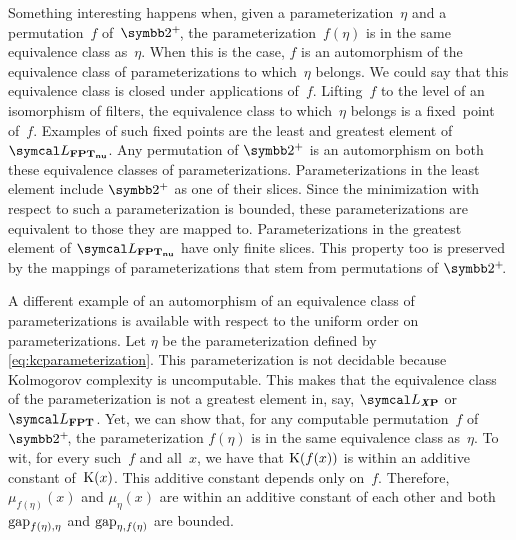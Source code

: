 Something interesting happens when, given a parameterization~$\eta$ and a permutation~$f$ of~$\binary^+\!$, the parameterization~$f(\eta)$ is in the same equivalence class as~$\eta$.
When this is the case, $f$ is an automorphism of the equivalence class of parameterizations to which~$\eta$ belongs.
We could say that this equivalence class is closed under applications of~$f$.
Lifting~$f$ to the level of an isomorphism of filters, the equivalence class to which~$\eta$ belongs is a fixed~point of~$f$.
Examples of such fixed points are the least and greatest element of $\calL_\clnu{FPT}$.
Any permutation of $\binary^+$ is an automorphism on both these equivalence classes of parameterizations.
Parameterizations in the least element include $\binary^+$ as one of their slices.
Since the minimization with respect to such a parameterization is bounded, these parameterizations are equivalent to those they are mapped to.
Parameterizations in the greatest element of $\calL_\clnu{FPT}$ have only finite slices.
This property too is preserved by the mappings of parameterizations that stem from permutations of $\binary^+\!$.
\begin{example}
  A different example of an automorphism of an equivalence class of parameterizations is available with respect to the uniform order on parameterizations.
  Let $\eta$ be the parameterization defined by \eqref{eq:kcparameterization}.
  This parameterization is not decidable because Kolmogorov complexity is uncomputable.
  This makes that the equivalence class of the parameterization is not a greatest element in, say, $\calL_\clX{P}$ or $\calL_\cl{FPT}$.
  Yet, we can show that, for any computable permutation~$f$ of~$\binary^+\!$, the parameterization $f(\eta)$ is in the same equivalence class as~$\eta$.
  To wit, for every such~$f$ and all~$x$, we have that $\operatorname{K}(f(x))$ is within an additive constant of~$\operatorname{K}(x)$.
  This additive constant depends only on~$f$.
  Therefore, $\mu_{f(\eta)}(x)$ and $\mu_\eta(x)$ are within an additive constant of each other and both $\operatorname{gap}_{f(\eta), \eta}$ and $\operatorname{gap}_{\eta, f(\eta)}$ are bounded.
\end{example}

